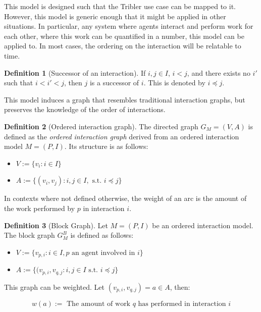 \documentclass[a4paper,11pt]{book}
\theoremstyle{definition}
\newtheorem{definition}{Definition}
\begin{document}
This model is designed such that the Tribler use case can be mapped to it. However, this model is
generic enough that it might be applied in other situations. In particular, any system where
agents interact and perform work for each other, where this work can be quantified in a number,
this model can be applied to. In most cases, the ordering on the interaction will be relatable
to time.

\begin{definition}[Successor of an interaction]
     If $i, j \in I$, $i < j$, and there exists no $i'$ such that $i < i' < j$, then
$j$ is a successor of $i$. This is denoted by $i \preceq j$.
\end{definition}
 
This model induces a graph that resembles traditional interaction graphs, but preserves the knowledge
of the order of interactions.
\begin{definition}[Ordered interaction graph]
    The directed graph $G_M = (V, A)$ is defined as the \emph{ordered interaction graph} derived from an ordered interaction model $M = (P,I)$.
    Its structure is as follows:

    \begin{itemize}
        \item $V := \{ v_{i} : i \in I\}$\\
        \item $A := \{ (v_{i}, v_{j}) : i, j \in I, \mbox{ s.t. } i \preceq j \}$\\
    \end{itemize}

    In contexts where not defined otherwise, the weight of an arc is the amount of the work performed by $p$ in
    interaction $i$. 
\end{definition}


\begin{definition}[Block Graph]
    Let $M = (P, I)$ be an ordered interaction model. The block graph $G^B_{M}$ is defined as follows:

    \begin{itemize}
        \item $V := \{ v_{p, i} : i \in I, p \mbox{ an agent involved in } i \}$\\
        \item $A := \{ (v_{p,i}, v_{q,j} : i, j \in I \mbox{ s.t. } i \preceq j \}$\\
    \end{itemize}

    This graph can be weighted. Let $(v_{p,i}, v_{q, j}) = a \in A$, then:

    \begin{equation*}
        w(a) := \mbox{ The amount of work } q \mbox{ has performed in interaction } i 
    \end{equation*}
\end{definition}
\end{document}

